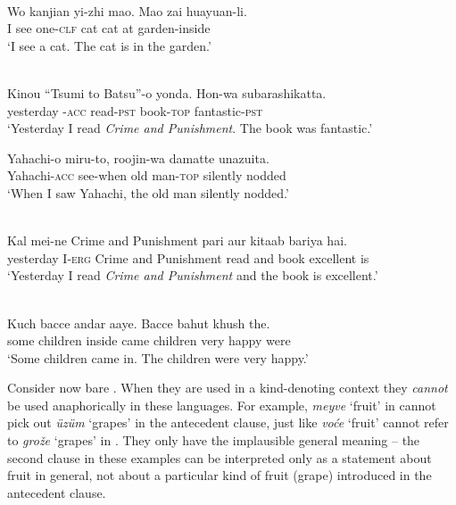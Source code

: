 \documentclass[output=paper,
modfonts
]{langscibook}
\begin{document}
	\ea \label{ex:despic:8}
	 \\
	\gll 
	{Wo} {kanjian} {yi-zhi} {mao}. {Mao} {zai} {huayuan-li.} \\
	I see one-\textsc{clf} cat cat at garden-inside \\ 
	\glt `I see a cat. The cat is in the garden.' \citep[403]{Dayal2004}  
	\z 
	
	\ea \label{ex:despic:9}
	 \\
	\ea \label{ex:despic:9a}
	\gll
	{Kinou} {``Tsumi to Batsu''-o} {yonda}. {Hon-wa} {subarashikatta}. \\
	yesterday \phantom{``}{Crime and Punishment}-\textsc{acc} read-\textsc{pst} book-\textsc{top} fantastic-\textsc{pst} \\ 
	\glt `Yesterday I read \textit{Crime and Punishment}. The book was fantastic.' 
	
	\ex \label{ex:despic:9b}
	\gll 
	{Yahachi-o} {miru-to}, {roojin-wa} {damatte} {unazuita}. \\
	Yahachi-\textsc{acc} see-when {old man-\textsc{top}} silently nodded \\ 
	\glt `When I saw Yahachi, the old man silently nodded.' \citep[14]{Fujisawa1992}
	\z
	\z 
	
	\ea \label{ex:despic:10}
	 \\ 
	\gll 
	{Kal} {mei-ne} {Crime and Punishment} {pari} {aur} {kitaab} {bariya} {hai.} \\
	yesterday I-\textsc{erg} {Crime and Punishment} read and book excellent is \\ 
	\glt `Yesterday I read \textit{Crime and Punishment} and the book is excellent.'
	\z
	
	\ea \label{ex:despic:11}
	 \\
	\gll
	{Kuch} {bacce} {andar} {aaye}. {Bacce} {bahut} {khush} {the.} \\
	some children inside came children very happy were \\ 
	\glt `Some children came in. The children were very happy.' \citep[403]{Dayal2004}
	\z 
	
	Consider now bare . When they are used in a kind-denoting context they \textit{cannot} be
	used anaphorically in these languages. For example, \textit{meyve} `fruit' in  cannot pick out \textit{\"uz\"um} `grapes' in the antecedent clause, just like \textit{vo\'ce} `fruit' cannot refer to \textit{gro\v z\dj e} `grapes' in . They only have the implausible general meaning -- the second clause in these examples can be interpreted only as a statement about fruit in general, not about a particular kind of fruit (grape) introduced in the antecedent clause. 
	
\end{document}
